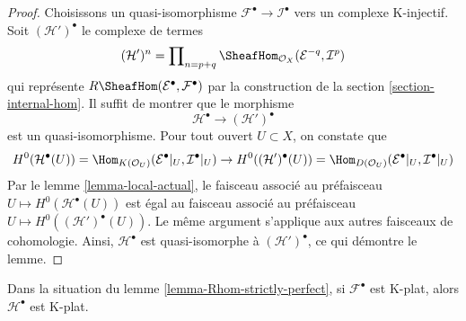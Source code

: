 \begin{proof}

Choisissons un quasi-isomorphisme $\mathcal{F}^\bullet \to \mathcal{I}^\bullet$
vers un complexe K-injectif. Soit $(\mathcal{H}')^\bullet$ le complexe de termes
$$
(\mathcal{H}')^n =
\prod\nolimits_{n = p + q}
\SheafHom_{\mathcal{O}_X}(\mathcal{E}^{-q}, \mathcal{I}^p)
$$
qui représente $R\SheafHom(\mathcal{E}^\bullet, \mathcal{F}^\bullet)$
par la construction de la section \ref{section-internal-hom}. Il suffit de montrer que le morphisme
$$
\mathcal{H}^\bullet \longrightarrow (\mathcal{H}')^\bullet
$$
est un quasi-isomorphisme. Pour tout ouvert $U \subset X$, on constate que
$$
H^0(\mathcal{H}^\bullet(U)) =
\Hom_{K(\mathcal{O}_U)}(\mathcal{E}^\bullet|_U, \mathcal{I}^\bullet|_U)
\to
H^0((\mathcal{H}')^\bullet(U)) =
\Hom_{D(\mathcal{O}_U)}(\mathcal{E}^\bullet|_U, \mathcal{I}^\bullet|_U)
$$
Par le lemme \ref{lemma-local-actual}, le faisceau associé au préfaisceau
$U \mapsto H^0(\mathcal{H}^\bullet(U))$
est égal au faisceau associé au préfaisceau
$U \mapsto H^0((\mathcal{H}')^\bullet(U))$. Le même argument s'applique aux autres faisceaux de cohomologie. Ainsi, $\mathcal{H}^\bullet$
est quasi-isomorphe à $(\mathcal{H}')^\bullet$, ce qui démontre le lemme.

\end{proof}

\begin{lemma}

\label{lemma-Rhom-strictly-perfect-K-flat}
Dans la situation du lemme \ref{lemma-Rhom-strictly-perfect}, si $\mathcal{F}^\bullet$ est K-plat, alors $\mathcal{H}^\bullet$ est K-plat.
\end{lemma}

